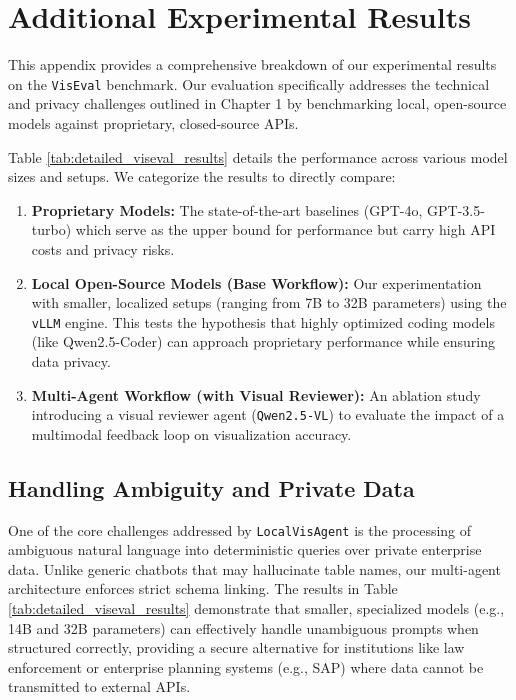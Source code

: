 \documentclass[a4paper,oneside,bibliography=totoc]{scrbook}
\begin{document}
\appendix
\chapter{Additional Experimental Results}

This appendix provides a comprehensive breakdown of our experimental results on the \texttt{VisEval} benchmark. Our evaluation specifically addresses the technical and privacy challenges outlined in Chapter 1 by benchmarking local, open-source models against proprietary, closed-source APIs.

Table \ref{tab:detailed_viseval_results} details the performance across various model sizes and setups. We categorize the results to directly compare:
\begin{enumerate}
    \item \textbf{Proprietary Models:} The state-of-the-art baselines (GPT-4o, GPT-3.5-turbo) which serve as the upper bound for performance but carry high API costs and privacy risks.
    \item \textbf{Local Open-Source Models (Base Workflow):} Our experimentation with smaller, localized setups (ranging from 7B to 32B parameters) using the \texttt{vLLM} engine. This tests the hypothesis that highly optimized coding models (like Qwen2.5-Coder) can approach proprietary performance while ensuring data privacy.
    \item \textbf{Multi-Agent Workflow (with Visual Reviewer):} An ablation study introducing a visual reviewer agent (\texttt{Qwen2.5-VL}) to evaluate the impact of a multimodal feedback loop on visualization accuracy.
\end{enumerate}

\section*{Handling Ambiguity and Private Data}
One of the core challenges addressed by \texttt{LocalVisAgent} is the processing of ambiguous natural language into deterministic queries over private enterprise data. Unlike generic chatbots that may hallucinate table names, our multi-agent architecture enforces strict schema linking. The results in Table \ref{tab:detailed_viseval_results} demonstrate that smaller, specialized models (e.g., 14B and 32B parameters) can effectively handle unambiguous prompts when structured correctly, providing a secure alternative for institutions like law enforcement or enterprise planning systems (e.g., SAP) where data cannot be transmitted to external APIs.
\end{document}
